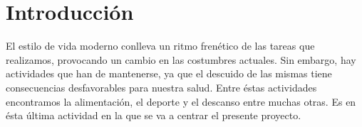 \documentclass[11pt,openany]{book}
\begin{document}


\tableofcontents %
\listoffigures %
\cleardoublepage
{} %
\listoftables %

\chapter{Introducción}

El estilo de vida moderno conlleva un ritmo frenético de las tareas que realizamos, provocando un cambio en las costumbres actuales. Sin embargo, hay actividades que han de mantenerse, ya que el descuido de las mismas tiene consecuencias desfavorables para nuestra salud. Entre éstas actividades encontramos la alimentación, el deporte y el descanso entre muchas otras. Es en ésta última actividad en la que se va a centrar el presente proyecto.
\end{document}
